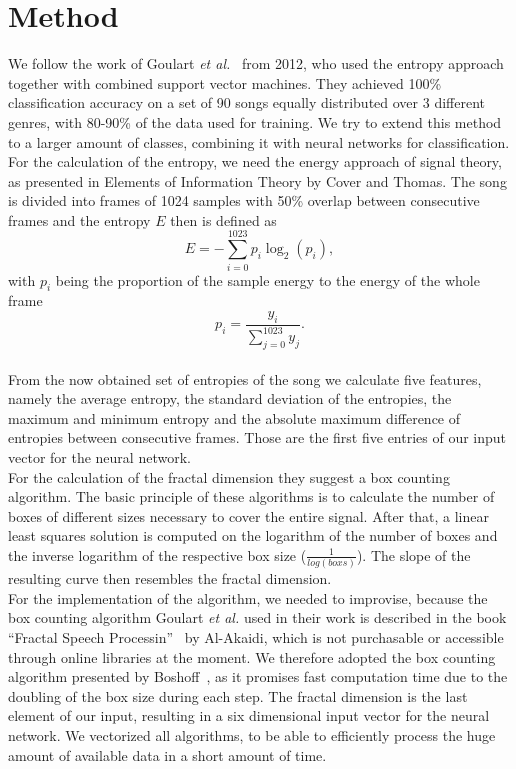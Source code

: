 \section{Method}
We follow the work of Goulart \textit{et al.}~\cite{entropy} from 2012,
who used the entropy approach together with combined support vector
machines. They achieved 100\% classification accuracy on a set of 90
songs equally distributed over 3 different genres, with 80-90\% of the
data used for training. We try to extend this method to a larger amount
of classes, combining it with neural networks for classification.\\
For the calculation of the entropy, we need the energy approach of
signal theory, as presented in Elements of Information Theory
\cite{infotheo} by Cover and Thomas. The song is divided into frames of
1024 samples with 50\% overlap between consecutive frames and the
entropy $E$ then is defined as
\begin{equation}
	E = - \sum_{i=0}^{1023} p_{i} \log_{2}(p_{i}),
\end{equation}
with $p_{i}$ being the proportion of the sample energy to the
energy of the whole frame
\begin{equation}
	p_i = \frac{y_i}{\sum_{j=0}^{1023} y_j}.
\end{equation}
\\
\noindent From the now obtained set of entropies of the song we
calculate five features, namely the average entropy, the standard
deviation of the entropies, the maximum and minimum entropy and the
absolute maximum difference of entropies between consecutive frames.
Those are the first five entries of our input vector for the neural
network.\\
For the calculation of the fractal dimension they suggest a box counting
algorithm. The basic principle of these algorithms is to calculate the
number of boxes of different sizes necessary to cover the entire signal.
After that, a linear least squares solution is computed on the logarithm
of the number of boxes and the inverse logarithm of the respective box
size ($\frac{1}{log(boxs)}$). The slope of the resulting curve then
resembles the fractal dimension.\\
For the implementation of the algorithm, we needed to improvise, because
the box counting algorithm Goulart \textit{et al.} used in their work is
described in the book ``Fractal Speech Processin''~\cite{fractal} by
Al-Akaidi, which is not purchasable or accessible through online
libraries at the moment. We therefore adopted the box counting algorithm
presented by Boshoff~\cite{boxcount}, as it promises fast computation
time due to the doubling of the box size during each step. The fractal
dimension is the last element of our input, resulting in a six
dimensional input vector for the neural network. We vectorized all
algorithms, to be able to efficiently process the huge amount of
available data in a short amount of time.

